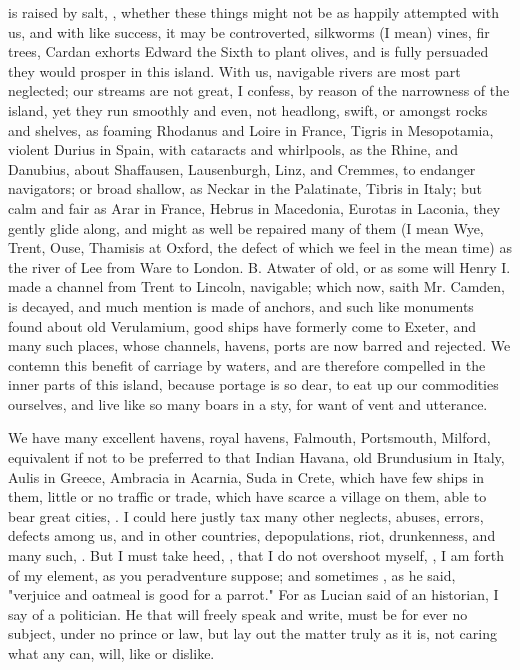 is raised by salt, \etc{}, whether these things might not be as happily
attempted with us, and with like success, it may be controverted, silkworms (I
mean) vines, fir trees, \etc{} Cardan exhorts Edward the Sixth to plant olives,
and is fully persuaded they would prosper in this island. With us, navigable
rivers are most part neglected; our streams are not great, I confess, by reason
of the narrowness of the island, yet they run smoothly and even, not headlong,
swift, or amongst rocks and shelves, as foaming Rhodanus and Loire in France,
Tigris in Mesopotamia, violent Durius in Spain, with cataracts and whirlpools,
as the Rhine, and Danubius, about Shaffausen, Lausenburgh, Linz, and Cremmes,
to endanger navigators; or broad shallow, as Neckar in the Palatinate, Tibris
in Italy; but calm and fair as Arar in France, Hebrus in Macedonia, Eurotas in
Laconia, they gently glide along, and might as well be repaired many of them (I
mean Wye, Trent, Ouse, Thamisis at Oxford, the defect of which we feel in the
mean time) as the river of Lee from Ware to London. B. Atwater of old, or as
some will Henry I. made a channel from Trent to Lincoln,
navigable; which now, saith Mr. Camden, is decayed, and much mention is made of
anchors, and such like monuments found about old
Verulamium, good ships have formerly come to Exeter, and
many such places, whose channels, havens, ports are now barred and rejected. We
contemn this benefit of carriage by waters, and are therefore compelled in the
inner parts of this island, because portage is so dear, to eat up our
commodities ourselves, and live like so many boars in a sty, for want of vent
and utterance.

We have many excellent havens, royal havens, Falmouth, Portsmouth, Milford,
\etc{} equivalent if not to be preferred to that Indian Havana, old Brundusium
in Italy, Aulis in Greece, Ambracia in Acarnia, Suda in Crete, which have few
ships in them, little or no traffic or trade, which have scarce a village on
them, able to bear great cities, . I could here
justly tax many other neglects, abuses, errors, defects among us, and in other
countries, depopulations, riot, drunkenness, \etc{} and many such, . But I must take heed, , that I do not overshoot myself, , I am forth of my
element, as you peradventure suppose; and sometimes ,
as he said, "verjuice and oatmeal is good for a parrot." For as Lucian said of
an historian, I say of a politician. He that will freely speak and write, must
be for ever no subject, under no prince or law, but lay out the matter truly as
it is, not caring what any can, will, like or dislike.

